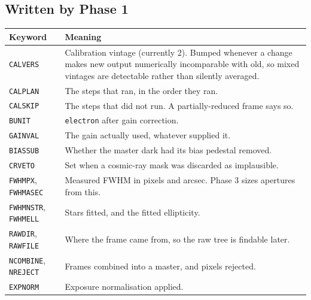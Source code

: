 \documentclass[11pt,a4paper]{article}
\begin{document}
\subsection{Written by Phase 1}
\begin{center}
\begin{longtable}{|p{3.3cm}|p{11.2cm}|}
\hline
\textbf{Keyword} & \textbf{Meaning} \\
\hline
\endhead
\texttt{CALVERS} & Calibration vintage (currently 2). Bumped whenever a change makes new output numerically incomparable with old, so mixed vintages are detectable rather than silently averaged. \\
\hline
\texttt{CALPLAN} & The steps that ran, in the order they ran. \\
\hline
\texttt{CALSKIP} & The steps that did not run. A partially-reduced frame says so. \\
\hline
\texttt{BUNIT} & \texttt{electron} after gain correction. \\
\hline
\texttt{GAINVAL} & The gain actually used, whatever supplied it. \\
\hline
\texttt{BIASSUB} & Whether the master dark had its bias pedestal removed. \\
\hline
\texttt{CRVETO} & Set when a cosmic-ray mask was discarded as implausible. \\
\hline
\texttt{FWHMPX}, \texttt{FWHMASEC} & Measured FWHM in pixels and arcsec. Phase 3 sizes apertures from this. \\
\hline
\texttt{FWHMNSTR}, \texttt{FWHMELL} & Stars fitted, and the fitted ellipticity. \\
\hline
\texttt{RAWDIR}, \texttt{RAWFILE} & Where the frame came from, so the raw tree is findable later. \\
\hline
\texttt{NCOMBINE}, \texttt{NREJECT} & Frames combined into a master, and pixels rejected. \\
\hline
\texttt{EXPNORM} & Exposure normalisation applied. \\
\hline
\end{longtable}
\end{center}
\end{document}
